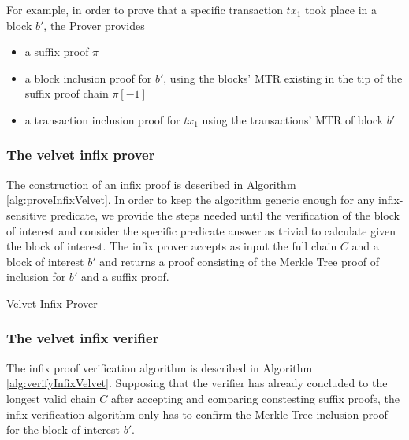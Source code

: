 \documentclass[11pt,a4paper]{article}
\begin{document}
For example, in order to prove that a specific transaction $tx_1$ took place in a block $b'$, the Prover provides
\begin{itemize}
\item a suffix proof $\pi$
\item a block inclusion proof for $b'$, using the blocks' MTR existing in the tip of the suffix proof chain $\pi[-1]$
\item a transaction inclusion proof for $tx_1$ using the transactions' MTR of block $b'$
\end{itemize}

\subsubsection*{The velvet infix prover}
The construction of an infix proof is described in Algorithm \ref{alg:proveInfixVelvet}. In order to keep the algorithm generic enough for any infix-sensitive predicate, we provide the steps needed until the verification of the block of interest and consider the specific predicate answer as trivial to calculate given the block of interest. The infix prover accepts as input the full chain $C$ and a block of interest $b'$ and returns a proof consisting of the Merkle Tree proof of inclusion for $b'$ and a suffix proof.
\vspace{4mm}

\begin{algorithm}[H]
\SetAlgoNoLine
\DontPrintSemicolon
{}
 \caption{Velvet Infix Prover}
 \label{alg:proveInfixVelvet}
\end{algorithm}

\vspace{4mm}

\subsubsection*{The velvet infix verifier}
The infix proof verification algorithm is described in Algorithm \ref{alg:verifyInfixVelvet}.
Supposing that the verifier has already concluded to the longest valid chain $C$ after accepting and comparing constesting suffix proofs, the infix verification algorithm only has to confirm the Merkle-Tree inclusion proof for the block of interest $b'$.
\end{document}
